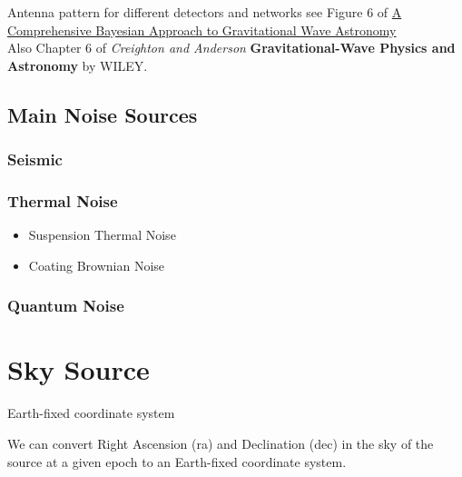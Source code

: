 \documentclass[11pt,fleqn]{book} %
\begin{document}
\begin{remark}
Antenna pattern for different detectors and networks  see Figure 6 of \href{http://scholarworks.montana.edu/xmlui/bitstream/handle/1/1740/LittenbergT0509.pdf?sequence=1}{A Comprehensive Bayesian Approach to Gravitational Wave Astronomy}\\

Also Chapter 6 of \emph{Creighton and Anderson} \textbf{Gravitational-Wave Physics and Astronomy} by WILEY.
\end{remark}

\subsection{Main Noise Sources}\label{sec:noise}


\vspace{.3 cm}
\subsubsection{Seismic}
\vspace{.3 cm}



\vspace{.3 cm}
\subsubsection{Thermal Noise}
\vspace{.3 cm}

\begin{itemize}
\item Suspension Thermal Noise
\item Coating Brownian Noise
\end{itemize}



\vspace{.3 cm}
\subsubsection{Quantum Noise}
\vspace{.3 cm}




\section{Sky Source}

{\large Earth-fixed coordinate system}

We can convert Right Ascension (ra) and Declination (dec) in the sky of the source at a given epoch to an Earth-fixed coordinate system. 
\end{document}
